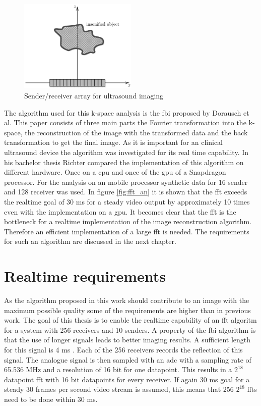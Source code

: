 \begin{figure}[h!]
    \centering
    \includegraphics[width=0.5\textwidth]{images/array.png}
    \captionsetup{justification=centering}
    \caption{Sender/receiver array for ultrasound imaging \cite{Dorausch_2022}}
    \label{fig:us_array}
\end{figure}

The algorithm used for this k-space analysis is the \ac{fbi} proposed by Dorausch et al. This paper consists of three main parts the Fourier transformation into the k-space, the reconstruction of the image with the transformed data and the back transformation to get the final image. As it is important for an clinical ultrasound device the algorithm was investigated for its real time capability. In his bachelor thesis Richter \cite{Richter_2024} compared the implementation of this algorithm on different hardware. Once on a \ac{cpu} and once of the \ac{gpu} of a Snapdragon processor. For the analysis on an mobile processor synthetic data for 16 sender and 128 receiver was used. In figure \ref{fig:fft_an} it is shown that the \ac{fft} exceeds the realtime goal of 30 ms for a steady video output by approximately 10 times even with the implementation on a \ac{gpu}. It becomes clear that the \ac{fft} is the bottleneck for a realtime implementation of the image reconstruction algorithm. Therefore an efficient implementation of a large \ac{fft} is needed. The requirements for such an algorithm are discussed in the next chapter\cite{Dorausch_2022}.

\section{Realtime requirements} \label{sec:req}
As the algorithm proposed in this work should contribute to an image with the maximum possible quality some of the requirements are higher than in previous work. The goal of this thesis is to enable the realtime capability of an \ac{fft} algoritm for a system with 256 receivers and 10 senders. A property of the \ac{fbi} algorithm is that the use of longer signals leads to better imaging results. A sufficient length for this signal is 4 ms \cite{dorausch_adoption_2023}. Each of the 256 receivers records the reflection of this signal. The analogue signal is then sampled with an \ac{adc} with a sampling rate of 65.536 MHz and a resolution of 16 bit for one datapoint. This results in a $2^{18}$ datapoint \ac{fft} with 16 bit datapoints for every receiver. If again 30 ms goal for a steady 30 frames per second video stream is assumed, this means that 256 $2^{18}$ \ac{fft}s need to be done within 30 ms.

